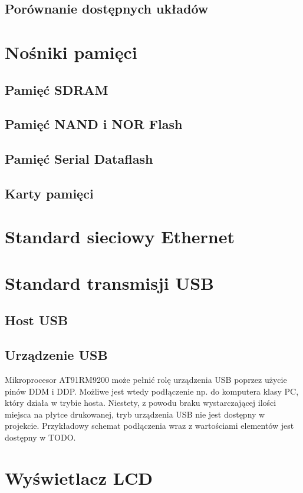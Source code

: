 \documentclass[a4paper]{report}
\begin{document}
			\subsection{Porównanie dostępnych układów}
		\section{Nośniki pamięci}
			\subsection{Pamięć SDRAM}			
			\subsection{Pamięć NAND i NOR Flash}
				
			\subsection{Pamięć Serial Dataflash}
			\subsection{Karty pamięci}
		\section{Standard sieciowy Ethernet}
		\section{Standard transmisji USB}
			\subsection{Host USB}
			
			\subsection{Urządzenie USB}Mikroprocesor AT91RM9200 może pełnić rolę urządzenia USB poprzez użycie pinów DDM i DDP. Możliwe jest wtedy podłączenie np. do komputera klasy PC, który działa w trybie hosta. Niestety, z powodu braku wystarczającej ilości miejsca na płytce drukowanej, tryb urządzenia USB nie jest dostępny w projekcie. Przykładowy schemat podłączenia wraz z wartościami elementów jest dostępny w TODO.
			
		\section{Wyświetlacz LCD}
\end{document}

